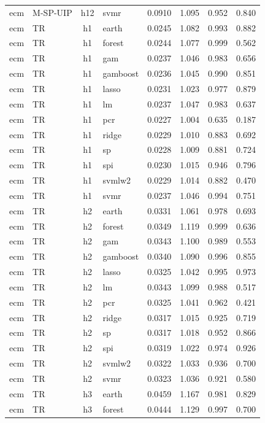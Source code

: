 \begin{ThreePartTable}
\begin{longtable}[t]{llclcccc}
ecm & M-SP-UIP & h12 & svmr & 0.0910 & 1.095 & 0.952 & 0.840\\
\addlinespace
ecm & TR & h1 & earth & 0.0245 & 1.082 & 0.993 & 0.882\\
ecm & TR & h1 & forest & 0.0244 & 1.077 & 0.999 & 0.562\\
ecm & TR & h1 & gam & 0.0237 & 1.046 & 0.983 & 0.656\\
ecm & TR & h1 & gamboost & 0.0236 & 1.045 & 0.990 & 0.851\\
ecm & TR & h1 & lasso & 0.0231 & 1.023 & 0.977 & 0.879\\
ecm & TR & h1 & lm & 0.0237 & 1.047 & 0.983 & 0.637\\
ecm & TR & h1 & pcr & 0.0227 & 1.004 & 0.635 & 0.187\\
ecm & TR & h1 & ridge & 0.0229 & 1.010 & 0.883 & 0.692\\
ecm & TR & h1 & sp & 0.0228 & 1.009 & 0.881 & 0.724\\
ecm & TR & h1 & spi & 0.0230 & 1.015 & 0.946 & 0.796\\
ecm & TR & h1 & svmlw2 & 0.0229 & 1.014 & 0.882 & 0.470\\
ecm & TR & h1 & svmr & 0.0237 & 1.046 & 0.994 & 0.751\\
\addlinespace
ecm & TR & h2 & earth & 0.0331 & 1.061 & 0.978 & 0.693\\
ecm & TR & h2 & forest & 0.0349 & 1.119 & 0.999 & 0.636\\
ecm & TR & h2 & gam & 0.0343 & 1.100 & 0.989 & 0.553\\
ecm & TR & h2 & gamboost & 0.0340 & 1.090 & 0.996 & 0.855\\
ecm & TR & h2 & lasso & 0.0325 & 1.042 & 0.995 & 0.973\\
ecm & TR & h2 & lm & 0.0343 & 1.099 & 0.988 & 0.517\\
ecm & TR & h2 & pcr & 0.0325 & 1.041 & 0.962 & 0.421\\
ecm & TR & h2 & ridge & 0.0317 & 1.015 & 0.925 & 0.719\\
ecm & TR & h2 & sp & 0.0317 & 1.018 & 0.952 & 0.866\\
ecm & TR & h2 & spi & 0.0319 & 1.022 & 0.974 & 0.926\\
ecm & TR & h2 & svmlw2 & 0.0322 & 1.033 & 0.936 & 0.700\\
ecm & TR & h2 & svmr & 0.0323 & 1.036 & 0.921 & 0.580\\
\addlinespace
ecm & TR & h3 & earth & 0.0459 & 1.167 & 0.981 & 0.829\\
ecm & TR & h3 & forest & 0.0444 & 1.129 & 0.997 & 0.700\\

\end{longtable}
\end{ThreePartTable}
